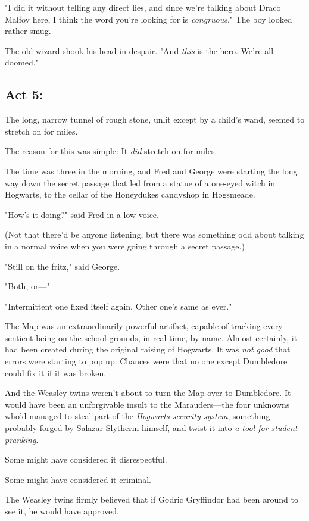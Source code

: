 "I did it without telling any direct lies, and since we're talking about Draco 
Malfoy here, I think the word you're looking for is \emph{congruous}." The boy 
looked rather smug.

The old wizard shook his head in despair. "And \emph{this} is the hero. We're 
all doomed."
\sbreak
\subsection{Act 5:}

The long, narrow tunnel of rough stone, unlit except by a child's wand, seemed 
to stretch on for miles.

The reason for this was simple: It \emph{did} stretch on for miles.

The time was three in the morning, and Fred and George were starting the long 
way down the secret passage that led from a statue of a one-eyed witch in 
Hogwarts, to the cellar of the Honeydukes candyshop in Hogsmeade.

"How's it doing?" said Fred in a low voice.

(Not that there'd be anyone listening, but there was something odd about 
talking in a normal voice when you were going through a secret passage.)

"Still on the fritz," said George.

"Both, or---"

"Intermittent one fixed itself again. Other one's same as ever."

The Map was an extraordinarily powerful artifact, capable of tracking every 
sentient being on the school grounds, in real time, by name. Almost certainly, 
it had been created during the original raising of Hogwarts. It was \emph{not 
good} that errors were starting to pop up. Chances were that no one except 
Dumbledore could fix it if it was broken.

And the Weasley twins weren't about to turn the Map over to Dumbledore. It 
would have been an unforgivable insult to the Marauders---the four unknowns 
who'd managed to steal part of the \emph{Hogwarts security system}, something 
probably forged by Salazar Slytherin himself, and twist it into \emph{a tool 
for student pranking}.

Some might have considered it disrespectful.

Some might have considered it criminal.

The Weasley twins firmly believed that if Godric Gryffindor had been around to 
see it, he would have approved.

